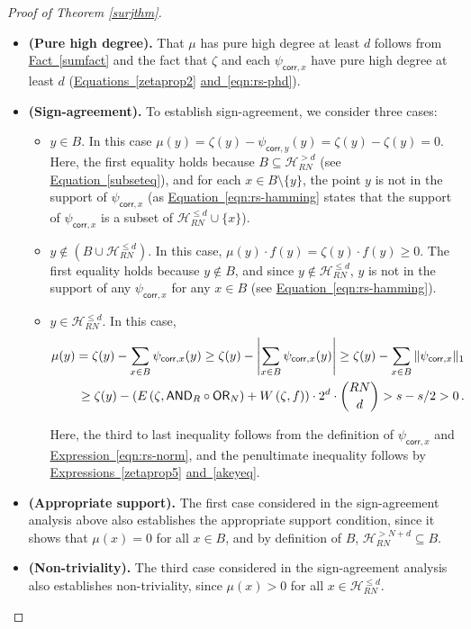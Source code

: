 \documentclass[11pt]{article}
\numberwithin{equation}{section}
\theoremstyle{definition}
\theoremstyle{plain}
\newcommand{\expref}[2]{\hyperref[#2]{#1~\ref{#2}}}
\newcommand{\expeqref}[2]{\hyperref[#2]{#1~\eqref{#2}}}
\newcommand{\OR}{\mathsf{ OR}}
\newcommand{\AND}{\mathsf{AND}}
\begin{document}
\begin{proof}[Proof of Theorem \ref{surjthm}]
	\begin{itemize}
	\item \textbf{(Pure high degree).} That $\mu$ has pure high degree at least $d$ follows from \expref{Fact}{sumfact} %
and the fact that $\zeta$ and each $\psi_{\mathsf{corr}, x}$ have pure high degree at least $d$	(\expeqref{Equations}{zetaprop2} \expeqref{and}{eqn:rs-phd}). 
		\item \textbf{(Sign-agreement).}
		To establish sign-agreement, we consider three cases:
		\begin{itemize}
			\item $y \in B$. In this case $\mu(y) = \zeta(y) - \psi_{\mathsf{corr}, y}(y) = \zeta(y) - \zeta(y) = 0$. Here,
the first equality holds because $B \subseteq \mathcal{H}_{RN}^{> d}$ 
(see \expeqref{Equation}{subseteq}), and for each
			$x \in B \setminus \{y\}$, the point $y$ is not in the support of $\psi_{\mathsf{corr}, x}$ (as \expeqref{Equation}{eqn:rs-hamming} states that the support of $\psi_{\mathsf{corr}, x}$ is a subset of $\mathcal{H}_{RN}^{\leq d} \cup \{x\}$).
			\item $y \not \in (B \cup \mathcal{H}^{\leq d}_{RN})$. In this case, $\mu(y) \cdot f(y) = \zeta(y) \cdot f(y) \geq 0$. The first equality holds 
			because $y \not \in B$, and since $y \not \in \mathcal{H}^{\leq d}_{RN}$, $y$ is not in the support of any $\psi_{\mathsf{corr}, x}$ for any $x \in B$ (see 
			\expeqref{Equation}{eqn:rs-hamming}). 
			\item $y \in \mathcal{H}^{\leq d}_{RN}$. In this case, \begin{align} 
			\mu(y) = \zeta(y) - \sum_{x \in B} \psi_{\mathsf{corr}, x}(y) \geq \zeta(y) - \left|\sum_{x \in B} \psi_{\mathsf{corr}, x}(y)\right|
			\geq \zeta(y) - \sum_{x \in B} \|\psi_{\mathsf{corr}, x}\|_1 \notag\\ \label{forsignrank} \geq
			\zeta(y) - \left(E\left(\zeta, \AND_R \circ \OR_N\right) +W\left(\zeta, f\right)\right) \cdot 2^d \cdot {RN \choose d} > s-s/2 >0\,.\end{align}
			
			Here, the third to last inequality follows from the definition of $\psi_{\mathsf{corr}, x}$ and \expeqref{Expression}{eqn:rs-norm}, and the penultimate
			inequality follows by \expeqref{Expressions}{zetaprop5} \expeqref{and}{akeyeq}.
			
		\end{itemize} 
		\item \textbf{(Appropriate support).}
		The first case considered in the sign-agreement analysis above also establishes the appropriate support condition, since it shows that $\mu(x)=0$ for all $x \in B$, and by definition of $B$, $\mathcal{H}^{> N+d}_{RN} \subseteq B$.
		\item \textbf{(Non-triviality).}
		The third case considered in the sign-agreement analysis also establishes non-triviality, since $\mu(x) > 0$ for all $x \in \mathcal{H}^{\leq d}_{RN}$. 
	\end{itemize}
	

\end{proof}
\end{document}
